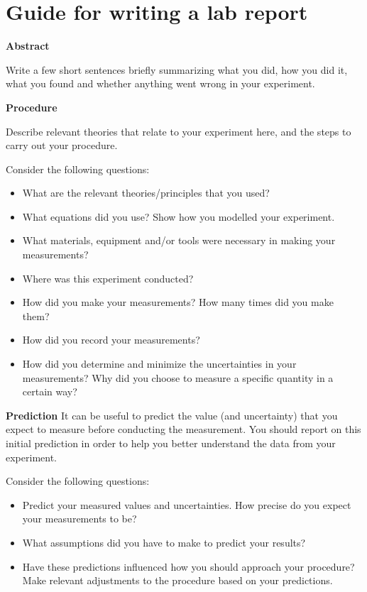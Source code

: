 \newpage
\section{Guide for writing a lab report}
 \vspace{0.25cm}
\textbf{Abstract}

Write a few short sentences briefly summarizing what you did, how you did it, what you found and whether anything went wrong in your experiment.

\textbf{Procedure}

Describe relevant theories that relate to your experiment here, and the steps to carry out your procedure. 

Consider the following questions:
\begin{itemize}
\item What are the relevant theories/principles that you used? 
\item What equations did you use? Show how you modelled your experiment.
\item What materials, equipment and/or tools were necessary in making your measurements?
\item Where was this experiment conducted?
\item How did you make your measurements? How many times did you make them?
\item How did you record your measurements?
\item How did you determine and minimize the uncertainties in your measurements? Why did you choose to measure a specific quantity in a certain way?
\end{itemize}

\textbf{Prediction}
It can be useful to predict the value (and uncertainty) that you expect to measure before conducting the measurement. You should report on this initial prediction in order to help you better understand the data from your experiment.

Consider the following questions:
\begin{itemize}
\item Predict your measured values and uncertainties. How precise do you expect your measurements to be?
\item What assumptions did you have to make to predict your results?
\item Have these predictions influenced how you should approach your procedure? Make relevant adjustments to the procedure based on your predictions.
\end{itemize}

